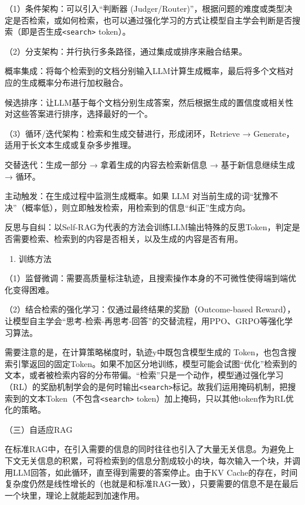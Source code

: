 （1）条件架构：可以引入``判断器 (Judger/Router)''，根据问题的难度或类型决定是否检索，或如何检索，也可以通过强化学习的方式让模型自主学会判断是否搜索（即是否生成\texttt{\textless{}search\textgreater{}} token）。

（2）分支架构：并行执行多条路径，通过集成或排序来融合结果。

概率集成：将每个检索到的文档分别输入LLM计算生成概率，最后将多个文档对应的生成概率分布进行加权融合。

候选排序：让LLM基于每个文档分别生成答案，然后根据生成的置信度或相关性对这些答案进行排序，选择最好的一个。

（3）循环/迭代架构：检索和生成交替进行，形成闭环，Retrieve → Generate，适用于长文本生成或复杂多步推理。

交替迭代：生成一部分 → 拿着生成的内容去检索新信息 → 基于新信息继续生成 → 循环。

主动触发：在生成过程中监测生成概率。如果 LLM 对当前生成的词``犹豫不决''（概率低），则立即触发检索，用检索到的信息``纠正''生成方向。

反思与自纠：以Self-RAG为代表的方法会训练LLM输出特殊的反思Token，判定是否需要检索、检索到的内容是否相关，以及生成的内容是否有用。

\begin{enumerate}
\def\labelenumi{\arabic{enumi}.}
\setcounter{enumi}{1}
\tightlist
\item
  训练方法
\end{enumerate}

（1）监督微调：需要高质量标注轨迹，且搜索操作本身的不可微性使得端到端优化变得困难。

（2）结合检索的强化学习：仅通过最终结果的奖励（Outcome-based Reward），让模型自主学会``思考-检索-再思考-回答''的交替流程，用PPO、GRPO等强化学习算法。

需要注意的是，在计算策略梯度时，轨迹y中既包含模型生成的 Token，也包含搜索引擎返回的固定Token。如果不加区分地训练，模型可能会试图``优化''检索到的文本，或者被检索内容的分布带偏。``检索''只是一个动作，模型通过强化学习（RL）的奖励机制学会的是何时输出\texttt{\textless{}search\textgreater{}}标记。故我们运用掩码机制，把搜索到的文本Token（不包含\texttt{\textless{}search\textgreater{}} token）加上掩码，只以其他token作为RL优化的策略。

（三）自适应RAG

在标准RAG中，在引入需要的信息的同时往往也引入了大量无关信息。为避免上下文无关信息的积累，可将检索到的信息分割成较小的块，每次输入一个块，并调用LLM回答，如此循环，直至得到需要的答案停止。由于KV Cache的存在，时间复杂度仍然是线性增长的（也就是和标准RAG一致），只要需要的信息不是在最后一个块里，理论上就能起到加速作用。

